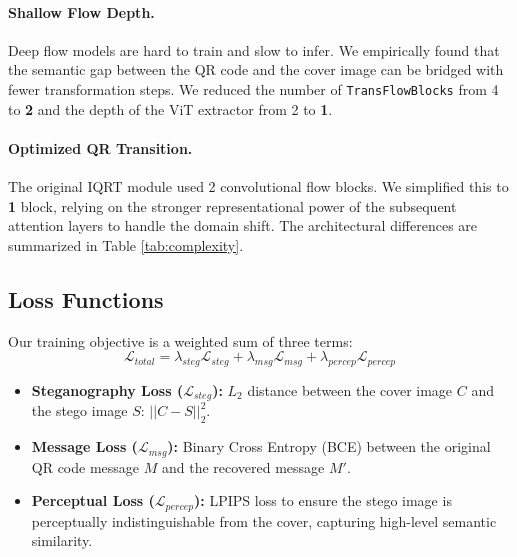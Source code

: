 \documentclass[10pt,twocolumn,letterpaper]{article}
\begin{document}
\paragraph{Shallow Flow Depth.} Deep flow models are hard to train and slow to infer. We empirically found that the semantic gap between the QR code and the cover image can be bridged with fewer transformation steps. We reduced the number of \texttt{TransFlowBlocks} from 4 to \textbf{2} and the depth of the ViT extractor from 2 to \textbf{1}.

\paragraph{Optimized QR Transition.} The original IQRT module used 2 convolutional flow blocks. We simplified this to \textbf{1} block, relying on the stronger representational power of the subsequent attention layers to handle the domain shift.
The architectural differences are summarized in Table \ref{tab:complexity}.

\begin{table}[t]
\centering
\caption{Comparison of Model Complexity and Inference Speed.}
\label{tab:complexity}
\end{table}

\subsection{Loss Functions}
Our training objective is a weighted sum of three terms:
\begin{equation}
    \mathcal{L}_{total} = \lambda_{steg} \mathcal{L}_{steg} + \lambda_{msg} \mathcal{L}_{msg} + \lambda_{percep} \mathcal{L}_{percep}
\end{equation}
\begin{itemize}
    \item \textbf{Steganography Loss ($\mathcal{L}_{steg}$):} $L_2$ distance between the cover image $C$ and the stego image $S$: $||C - S||_2^2$.
    \item \textbf{Message Loss ($\mathcal{L}_{msg}$):} Binary Cross Entropy (BCE) between the original QR code message $M$ and the recovered message $M'$.
    \item \textbf{Perceptual Loss ($\mathcal{L}_{percep}$):} LPIPS loss to ensure the stego image is perceptually indistinguishable from the cover, capturing high-level semantic similarity.
\end{itemize}
\end{document}
